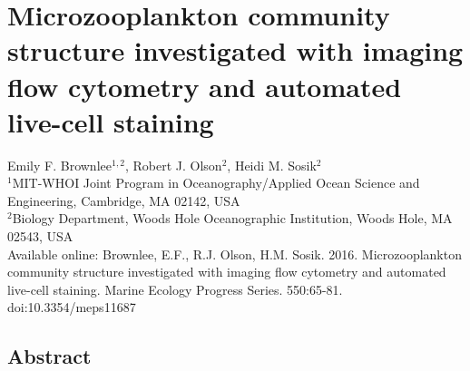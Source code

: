 

\chapter{Microzooplankton community structure investigated with imaging flow cytometry and automated live-cell staining}

Emily F. Brownlee$^{1,2}$, Robert J. Olson$^{2}$, Heidi M. Sosik$^{2}$\\                                                         
$^{1}$MIT-WHOI Joint Program in Oceanography/Applied Ocean Science and Engineering, Cambridge, MA 02142, USA\\
$^{2}$Biology Department, Woods Hole Oceanographic Institution, Woods Hole, MA 02543, USA\\

Available online: Brownlee, E.F., R.J. Olson, H.M. Sosik. 2016. Microzooplankton community structure
investigated with imaging flow cytometry and automated live-cell staining. Marine Ecology
Progress Series. 550:65-81. doi:10.3354/meps11687

\section{Abstract}

